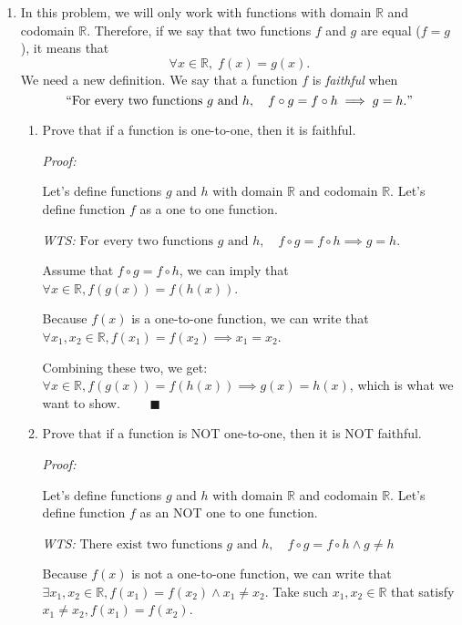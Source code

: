 \documentclass[12pt]{exam}
\newcommand{\vv}{\vspace{.1cm}}
\newcommand{\R}{\mathbb{R}}
\begin{document}
\begin{enumerate}

\item In this problem, we will only work with functions with domain $\mathbb{R}$ and codomain $\R$.   Therefore, if we say that two functions $f$ and $g$ are equal ($f=g$), it means that 
	$$
		\forall x \in \R, \; f(x)  = g(x) .
	$$
We need a new definition.  We say that a function $f$ is \emph{faithful} when
	\begin{equation*}
		``\mbox{For every two functions } g \mbox{ and } h, \quad f \circ g = f \circ h \implies g = h."
	\end{equation*}
	\begin{enumerate}
		\item  Prove that if a function is one-to-one, then it is faithful.
		
{
	\vv

	\emph{Proof:}

	\vv

	Let's define functions $g$ and $h$ with domain $\R$ and codomain $\R$. Let's define function $f$ as a one to one function.

	\emph{WTS:} $\mbox{For every two functions } g \mbox{ and } h, \quad f \circ g = f \circ h \implies g = h.$


	Assume that $f \circ g = f \circ h$, 
	we can imply that $\forall x \in \R, f(g(x)) = f(h(x)) $.

	Because $f(x)$ is a one-to-one function, we can write that $\forall x_1, x_2 \in \R, f(x_1) = f(x_2) \implies x_1 = x_2$.


	Combining these two, we get:
	$\forall x \in \R, f(g(x)) = f(h(x)) \implies g(x) = h(x)$, which is what we want to show. $\qquad \blacksquare$
}
		
		\item  Prove that if a function is NOT one-to-one, then it is NOT faithful.
{
	\vv

	\emph{Proof:}

	\vv

	Let's define functions $g$ and $h$ with domain $\R$ and codomain $\R$. Let's define function $f$ as an NOT one to one function.

	\emph{WTS:} $\mbox{There exist two functions } g \mbox{ and } h, \quad f \circ g = f \circ h \land g \neq h$

	Because $f(x)$ is not a one-to-one function, we can write that $\exists x_1, x_2 \in \R, f(x_1) = f(x_2) \land x_1 \neq x_2$.
	Take such $x_1, x_2 \in \R$ that satisfy $x_1 \neq x_2, f(x_1) = f(x_2)$.


}
\end{enumerate}
\end{enumerate}
\end{document}

